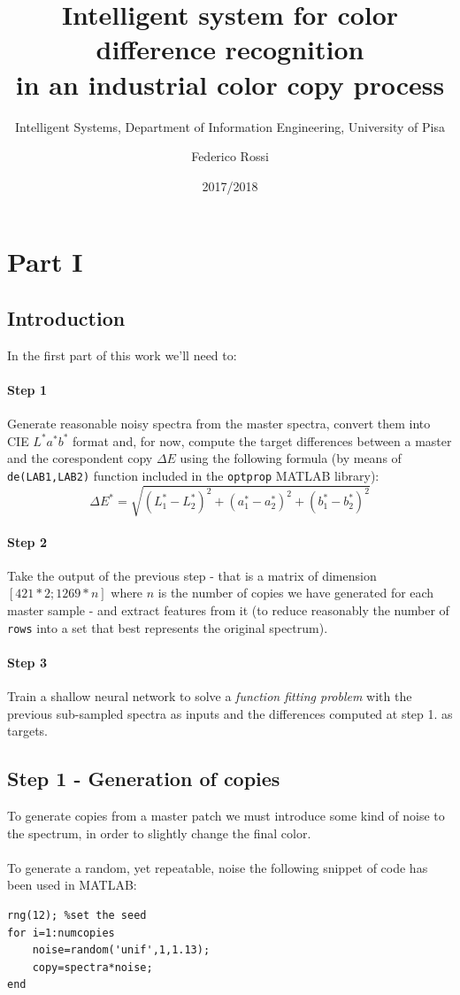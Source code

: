 \documentclass[twocolumn,a4paper]{article}
\title{Intelligent system for color difference recognition\\ in an industrial color copy process}
\subtitle{Intelligent Systems, Department of Information Engineering, University of Pisa}
\author{Federico Rossi}
\date{2017/2018}
\begin{document}
\maketitle
\section{Part I}
\subsection{Introduction}
In the first part of this work we'll need to:
\paragraph{Step 1}Generate reasonable noisy spectra from the master spectra, convert them into CIE $L^*a^*b^*$ format and, for now, compute the target differences between a master and the corespondent copy $\Delta E$ using the following formula (by means of \texttt{de(LAB1,LAB2)} function included in the \texttt{optprop} MATLAB library):
    \begin{equation}\label{eqn:formula}
        \Delta E^* = \sqrt{(L_1^*-L_2^*)^2+(a_1^*-a_2^*)^2+(b_1^*-b_2^*)^2}
    \end{equation}
\paragraph{Step 2}Take the output of the previous step - that is a matrix of dimension $[421*2; 1269*n]$ where $n$ is the number of copies we have generated for each master sample - and extract features from it (to reduce reasonably the number of \texttt{rows} into a set that best represents the original spectrum).
\paragraph{Step 3}Train a shallow neural network to solve a \textit{function fitting problem} with the previous sub-sampled spectra as inputs and the differences computed at step 1. as targets.
\subsection{Step 1 - Generation of copies}
To generate copies from a master patch we must introduce some kind of noise to the spectrum, in order to slightly change the final color.
\paragraph{} To generate a random, yet repeatable, noise the following snippet of code has been used in MATLAB:
\begin{lstlisting}
rng(12); %set the seed
for i=1:numcopies
    noise=random('unif',1,1.13);
    copy=spectra*noise;
end
\end{lstlisting}
\end{document}
